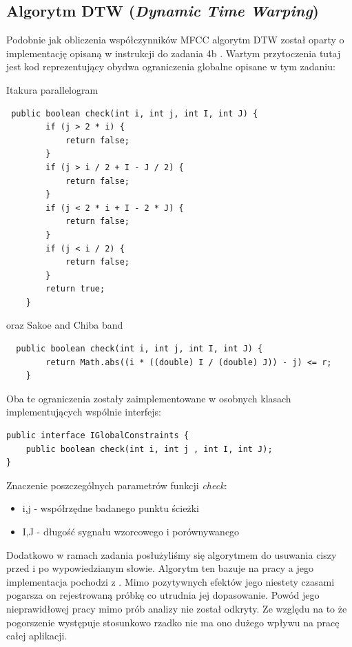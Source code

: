 \documentclass{classrep}
\begin{document}
\subsection{Algorytm DTW (\textit{Dynamic Time Warping})}
Podobnie jak obliczenia współczynników MFCC algorytm DTW został oparty o implementację opisaną w instrukcji do zadania 4b \cite{1}. Wartym przytoczenia tutaj jest kod reprezentujący obydwa ograniczenia globalne opisane w tym zadaniu:

Itakura parallelogram
\begin{lstlisting}
 public boolean check(int i, int j, int I, int J) {
        if (j > 2 * i) {
            return false;
        }
        if (j > i / 2 + I - J / 2) {
            return false;
        }
        if (j < 2 * i + I - 2 * J) {
            return false;
        }
        if (j < i / 2) {
            return false;
        }
        return true;
    }
\end{lstlisting}

oraz Sakoe and Chiba band
\begin{lstlisting}
  public boolean check(int i, int j, int I, int J) {
        return Math.abs((i * ((double) I / (double) J)) - j) <= r;
    }
\end{lstlisting}

Oba te ograniczenia zostały zaimplementowane w osobnych klasach implementujących wspólnie interfejs:
\begin{lstlisting}
public interface IGlobalConstraints {
    public boolean check(int i, int j , int I, int J);
}
\end{lstlisting}
Znaczenie poszczególnych parametrów funkcji \textit{check}:
\begin{itemize}
\item i,j - współrzędne badanego punktu ścieżki
\item I,J - długość sygnału wzorcowego i porównywanego
\end{itemize}

Dodatkowo w ramach zadania posłużyliśmy się algorytmem do usuwania ciszy przed i po wypowiedzianym słowie. Algorytm ten bazuje na pracy \cite{2} a jego implementacja pochodzi z \cite{3}. Mimo pozytywnych efektów jego niestety czasami pogarsza on rejestrowaną próbkę co utrudnia jej dopasowanie. Powód jego nieprawidłowej pracy mimo prób analizy nie został odkryty. Ze względu na to że pogorszenie występuje stosunkowo rzadko nie ma ono dużego wpływu na pracę całej aplikacji.
\end{document}
